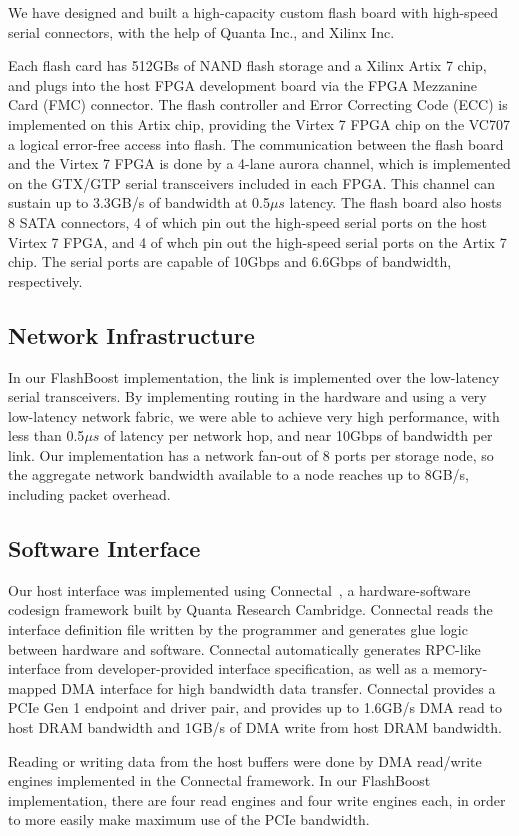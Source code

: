 We have designed and built a high-capacity custom flash board with high-speed
serial connectors, with the help of Quanta Inc., and Xilinx Inc.

Each flash card has 512GBs of NAND flash storage and a Xilinx Artix 7 chip, and
plugs into the host FPGA development board via the FPGA Mezzanine Card (FMC)
connector. The flash controller and Error Correcting Code (ECC) is implemented
on this Artix chip, providing the Virtex 7 FPGA chip on the VC707 a logical
error-free access into flash. The communication between the flash board and the
Virtex 7 FPGA is done by a 4-lane aurora channel, which is implemented on the
GTX/GTP serial transceivers included in each FPGA. This channel can sustain up
to 3.3GB/s of bandwidth at 0.5$\mu s$ latency.
The flash board also hosts 8 SATA connectors, 4 of
which pin out the high-speed serial ports on the host Virtex 7 FPGA,
and 4 of whch pin out the high-speed serial ports on the Artix 7 chip.
The serial ports are capable of 10Gbps and 6.6Gbps of bandwidth, respectively.

\subsection{Network Infrastructure}

In our FlashBoost implementation, the link is implemented over the
low-latency serial transceivers.  By
implementing routing in the hardware and using a very low-latency network
fabric, we were able to achieve very high performance, with less than 0.5$\mu s$ of
latency per network hop, and near 10Gbps of bandwidth per link. Our
implementation has a network fan-out of 8 ports per storage node, so the
aggregate network bandwidth available to a node reaches up to 8GB/s, including
packet overhead.

\subsection{Software Interface}

Our host interface was implemented using Connectal~\cite{connectal}, a
hardware-software codesign framework built by Quanta Research Cambridge.
Connectal reads the interface definition file written by the programmer and
generates glue logic between hardware and software. Connectal automatically
generates RPC-like interface from developer-provided interface specification, as
well as a memory-mapped DMA interface for high bandwidth data transfer.
Connectal provides a PCIe Gen 1 endpoint and driver pair, and provides up to
1.6GB/s DMA read to host DRAM bandwidth and 1GB/s of DMA write from host DRAM
bandwidth. 

Reading or writing data from the host buffers were done by DMA read/write
engines implemented in the Connectal framework. In our FlashBoost
implementation, there are four read engines and four write engines each, in
order to more easily make maximum use of the PCIe bandwidth. 


